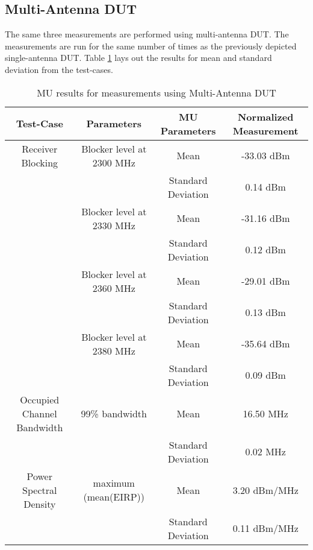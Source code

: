 \subsection{Multi-Antenna \acs{DUT}}
The same three measurements are performed using multi-antenna \acs{DUT}. The measurements are run for the same number of times as the previously depicted single-antenna \acs{DUT}. Table \ref{tab:Tab4} lays out the results for mean and standard deviation from the test-cases.
\begin{table}[H]
\resizebox{\textwidth}{!}
{
        \begin{tabular}{|c|c|c|c|}\toprule
         \textbf{Test-Case} & Parameters & \textbf{MU Parameters} & \textbf{Normalized Measurement} \\
            \midrule
           Receiver Blocking & Blocker level at 2300 MHz & Mean     & -33.03 dBm \\
                         &    & Standard Deviation & 0.14 dBm     \\

          &  Blocker level at 2330 MHz & Mean     & -31.16 dBm       \\
                     &        & Standard Deviation & 0.12 dBm    \\

          & Blocker level at 2360 MHz & Mean       & -29.01 dBm    \\
                          &   & Standard Deviation & 0.13 dBm      \\
                           
          & Blocker level at 2380 MHz & Mean      & -35.64 dBm    \\
                       &      & Standard Deviation & 0.09 dBm     \\
                       \midrule
                      
          Occupied Channel Bandwidth & 99\% bandwidth & Mean & 16.50 MHz \\
           &  & Standard Deviation & 0.02 MHz \\
           
           \midrule
           Power Spectral Density &   maximum (mean(EIRP)) & Mean &  3.20 dBm/MHz \\
           & & Standard Deviation & 0.11 dBm/MHz \\          
           \bottomrule
        \end{tabular}}
        \caption{\acf{MU} results for measurements using Multi-Antenna \acs{DUT}}\label{tab:Tab4}
 \end{table} 


